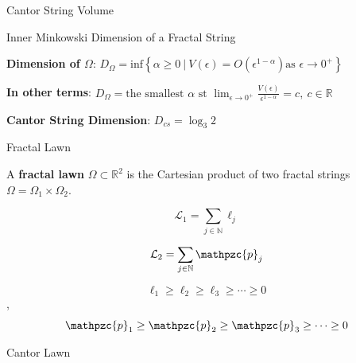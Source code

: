 \documentclass{if-beamer}
\newcommand{\R}{\mathbb{R}}
\newcommand{\N}{\mathbb{N}}
\newcommand{\SL}{\mathcal{L}}
\newcommand{\Om}{\Omega}
\newcommand{\p}{\mathpzc{p}}
\begin{document}
\begin{frame}{Cantor String Volume}
	\begin{center}
	\end{center}
\end{frame}



\begin{frame}{Inner Minkowski Dimension of a Fractal String}

\begin{definition}
{\bf Dimension of $\Om$}: $D_\Om =\text{inf}\left\{ \alpha \geq 0\ |\ V(\epsilon)=O\left(\epsilon^{1-\alpha}\right) \text{as  } \epsilon \rightarrow 0^{+}\right\}$
\end{definition}

\pause
\vspace{.2 in}

{\bf In other terms}: $D_\Om = \text{the smallest  }\alpha \text{ st } \displaystyle \lim_{\epsilon \to 0^{+}} \frac{V(\epsilon)}{\epsilon^{1-\alpha}}=c, \ c\in \mathbb{R}$

\pause
\vspace{.2 in}

{\bf Cantor String Dimension}: $D_{cs} = \log_3 2$

\end{frame}



\begin{frame}{Fractal Lawn}

	\begin{definition}
	A {\bf fractal lawn} $\Om \subset \R^2$ is the Cartesian product of two fractal strings $\Om=\Om_1\times\Om_2$.
	\end{definition}
	
	\pause
	\vspace{0.2 in}

	\[ \displaystyle \SL_1 = \sum_{j \in \N} \ell_j \]
	
	\[ \displaystyle \SL_2 = \sum_{j \in \N} \p_j \]
	\pause
	
	\[ \ell_1 \geq \ell_2 \geq \ell_3 \geq \cdots \geq 0 \], \quad \[ \p_1 \geq \p_2 \geq \p_3 \geq \cdots \geq 0 \]

\end{frame}

\begin{frame}{Cantor Lawn}
	\begin{center}
	\end{center}
\end{frame}
\end{document}
